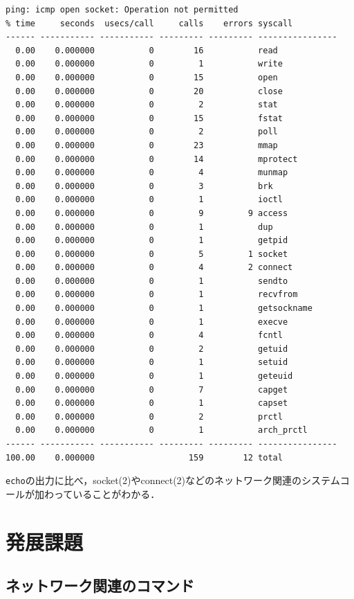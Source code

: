\documentclass[a4j,10pt,titlepage]{jsarticle}
\begin{document}
\begin{verbatim}
ping: icmp open socket: Operation not permitted
% time     seconds  usecs/call     calls    errors syscall
------ ----------- ----------- --------- --------- ----------------
  0.00    0.000000           0        16           read
  0.00    0.000000           0         1           write
  0.00    0.000000           0        15           open
  0.00    0.000000           0        20           close
  0.00    0.000000           0         2           stat
  0.00    0.000000           0        15           fstat
  0.00    0.000000           0         2           poll
  0.00    0.000000           0        23           mmap
  0.00    0.000000           0        14           mprotect
  0.00    0.000000           0         4           munmap
  0.00    0.000000           0         3           brk
  0.00    0.000000           0         1           ioctl
  0.00    0.000000           0         9         9 access
  0.00    0.000000           0         1           dup
  0.00    0.000000           0         1           getpid
  0.00    0.000000           0         5         1 socket
  0.00    0.000000           0         4         2 connect
  0.00    0.000000           0         1           sendto
  0.00    0.000000           0         1           recvfrom
  0.00    0.000000           0         1           getsockname
  0.00    0.000000           0         1           execve
  0.00    0.000000           0         4           fcntl
  0.00    0.000000           0         2           getuid
  0.00    0.000000           0         1           setuid
  0.00    0.000000           0         1           geteuid
  0.00    0.000000           0         7           capget
  0.00    0.000000           0         1           capset
  0.00    0.000000           0         2           prctl
  0.00    0.000000           0         1           arch_prctl
------ ----------- ----------- --------- --------- ----------------
100.00    0.000000                   159        12 total
\end{verbatim}

\verb|echo|の出力に比べ，socket(2)やconnect(2)などのネットワーク関連のシステムコールが加わっていることがわかる．

\section{発展課題}
\subsection{ネットワーク関連のコマンド}
\end{document}
